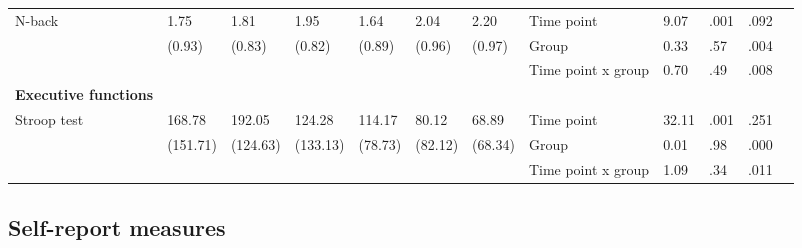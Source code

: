 \documentclass[authordate, empirical,issue]{jote-new-article}
\begin{document}
\begin{table}[t]
\begin{fullwidth}
{\begin{tabular}{@{} l l l l l l l | l l l l l @{}}
        \hline N-back                                  & 1.75                                          & 1.81                 & 1.95                 & 1.64          & 2.04                                  & 2.20    & Time point         & 9.07  & .001 & .092   \\
                                                       & (0.93)                                        & (0.83)               & (0.82)               & (0.89)        & (0.96)                                & (0.97)  & Group              & 0.33  & .57  & .004   \\
                                                       &                                               &                      &                      &               &                                       &         & Time point x group & 0.70  & .49  & .008   \\

        \textbf{Executive functions}                   &                                               &                      &                      &               &                                       &         &                    &       &      &      & \\

        \hline Stroop test                             & 168.78                                        & 192.05               & 124.28               & 114.17        & 80.12                                 & 68.89   & Time point         & 32.11 & .001 & .251   \\
                                                       & (151.71)                                      & (124.63)             & (133.13)             & (78.73)       & (82.12)                               & (68.34) & Group              & 0.01  & .98  & .000   \\
                                                       &                                               &                      &                      &               &                                       &         & Time point x group & 1.09  & .34  & .011   \\
        \bottomrule
      \end{tabular}}
  \end{fullwidth}
\end{table}




\subsection{Self-report measures}
\end{document}
